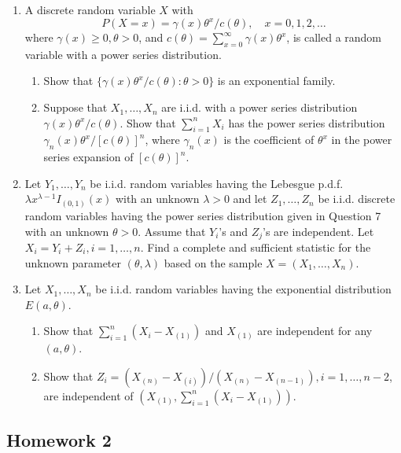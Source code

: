 \begin{enumerate}
    \item A discrete random variable \(X\) with 
    \[
    P(X=x)=\gamma(x)\theta^{x}/c(\theta),\quad x=0,1,2,\ldots
    \]
    where \(\gamma(x)\geq 0,\theta>0\), and \(c(\theta)=\sum_{x=0}^{\infty}\gamma(x)\theta^{x}\), is called a random variable with a power series distribution.
    \begin{enumerate}
        \item Show that \(\{\gamma(x)\theta^{x}/c(\theta):\theta>0\}\) is an exponential family.
        \item Suppose that \(X_{1},\ldots,X_{n}\) are i.i.d. with a power series distribution \(\gamma(x)\theta^{x}/c(\theta)\). Show that \(\sum_{i=1}^{n}X_{i}\) has the power series distribution \(\gamma_{n}(x)\theta^{x}/[c(\theta)]^{n}\), where \(\gamma_{n}(x)\) is the coefficient of \(\theta^{x}\) in the power series expansion of \([c(\theta)]^{n}\).
    \end{enumerate}

    \item Let \(Y_{1},\ldots,Y_{n}\) be i.i.d. random variables having the Lebesgue p.d.f. \(\lambda x^{\lambda-1}I_{(0,1)}(x)\) with an unknown \(\lambda>0\) and let \(Z_{1},\ldots,Z_{n}\) be i.i.d. discrete random variables having the power series distribution given in Question 7 with an unknown \(\theta>0\). Assume that \(Y_{i}\)'s and \(Z_{j}\)'s are independent. Let \(X_{i}=Y_{i}+Z_{i},i=1,\ldots,n\). Find a complete and sufficient statistic for the unknown parameter \((\theta,\lambda)\) based on the sample \(X=(X_{1},\ldots,X_{n})\).

    \item Let \(X_{1},\ldots,X_{n}\) be i.i.d. random variables having the exponential distribution \(E(a,\theta)\).
    \begin{enumerate}
        \item Show that \(\sum_{i=1}^{n}\left(X_{i}-X_{(1)}\right)\) and \(X_{(1)}\) are independent for any \((a,\theta)\).
        \item Show that \(Z_{i}=\left(X_{(n)}-X_{(i)}\right)/\left(X_{(n)}-X_{(n-1)}\right),i=1,\ldots,n-2\), are independent of \(\left(X_{(1)},\sum_{i=1}^{n}\left(X_{i}-X_{(1)}\right)\right)\).
    \end{enumerate}
\end{enumerate}

\subsection*{Homework 2}

